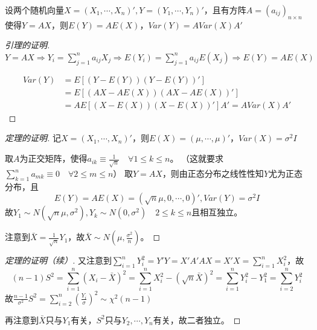 \documentclass[UTF-8]{ctexbeamer}
\begin{document}
\begin{frame}
  \begin{Lemma}
    设两个随机向量$X=(X_1,\cdots,X_n)',Y=(Y_1,\cdots,Y_n)'$，且有方阵$A=(a_{ij})_{n\times n}$使得$Y=AX$，则$E(Y)=AE(X)$，$Var(Y)=AVar(X)A'$
  \end{Lemma}

\begin{proof}[引理的证明]
  $Y=AX\Rightarrow Y_{i}=\sum_{j=1}^{n}a_{ij}X_{j}\Rightarrow E(Y_{i})=\sum_{j=1}^{n}a_{ij}E(X_{j})\Rightarrow E(Y)=AE(X)$


  \[\begin{aligned}
Var(Y)&=E[(Y − E(Y))(Y − E(Y))']\\
&=E[(AX − AE(X))(AX −AE(X))']\\
&=AE[(X − E(X))(X − E(X))']A'=AVar(X)A'
\end{aligned}\]
\end{proof}
\end{frame}

\begin{frame}
  \begin{proof}[定理的证明]
    记$X=(X_{1},\cdots,X_{n})'$，则$E(X)=(\mu,\cdots,\mu)'$，$Var(X)=\sigma^{2} I$

    取$A$为正交矩阵，使得$a_{ik}\equiv \frac{1}{\sqrt{n}}\quad \forall 1\leq k\leq n$。
    （这就要求$\sum\limits_{k=1}^{n}a_{mk}\equiv 0\quad \forall 2\leq m\leq n$）
    取$Y=AX$，则由正态分布之线性性知$Y$尤为正态分布，且
    \[E(Y)=AE(X)=(\sqrt{n}\mu,0,\cdots,0)',Var(Y)=\sigma^{2}I\]
    故$Y_{1}\sim N(\sqrt{n}\mu,\sigma^{2}),Y_{k}\sim N(0,\sigma^{2})\quad 2\leq k\leq n$且相互独立。

    注意到$\bar X=\frac{1}{\sqrt{n}}Y_{1}$，故$\bar X\sim N(\mu,\frac{\sigma^{2}}{n})$。
\end{proof}
  \end{frame}
  
\begin{frame}
    \begin{proof}[定理的证明（续）]
    又注意到$\sum_{i=1}^{n}Y_{i}^{2}=Y'Y=X'A'AX=X'X=\sum_{i=1}^{n}X_{i}^{2}$，故
    \[(n-1)S^{2}=\sum_{i=1}^{n}(X_{i}-\bar X)^{2}=\sum_{i=1}^{n}X_{i}^{2}-(\sqrt n \bar X)^{2}=\sum_{i=1}^{n}Y_{i}^{2}-Y_{1}^{2}=\sum_{i=2}^{n}Y_{i}^{2}\]
    故$\frac{n-1}{\sigma^{2}}S^{2}=\sum_{i=2}^{n}(\frac{Y_{i}}{\sigma})^{2}\sim \chi^{2}(n-1)$

    再注意到$\bar X$只与$Y_{1}$有关，$S^{2}$只与$Y_{2},\cdots,Y_{n}$有关，故二者独立。
  \end{proof}
\end{frame}
\end{document}
